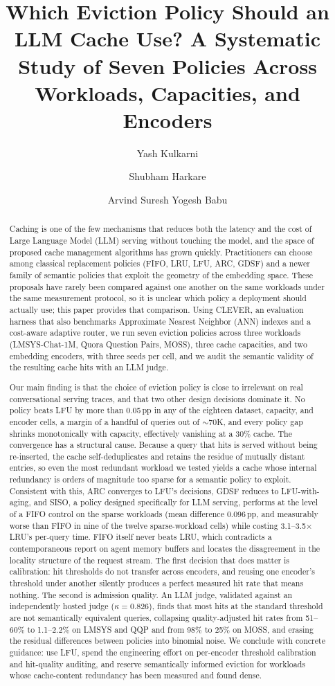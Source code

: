 \documentclass[sigconf,nonacm]{acmart}
\title{Which Eviction Policy Should an LLM Cache Use?
A Systematic Study of Seven Policies Across Workloads,
Capacities, and Encoders}
\author{Yash Kulkarni}
\affiliation{
  \institution{University of Michigan}
  \city{Ann Arbor}
  \state{Michigan}
  \country{USA}
}
\author{Shubham Harkare}
\affiliation{
  \institution{University of Michigan}
  \city{Ann Arbor}
  \state{Michigan}
  \country{USA}
}
\author{Arvind Suresh Yogesh Babu}
\affiliation{
  \institution{University of Michigan}
  \city{Ann Arbor}
  \state{Michigan}
  \country{USA}
}
\begin{document}
\begin{abstract}
Caching is one of the few mechanisms that reduces both the latency and the cost of Large Language Model (LLM) serving without touching the model, and the space of proposed cache management algorithms has grown quickly. Practitioners can choose among classical replacement policies (FIFO, LRU, LFU, ARC, GDSF) and a newer family of semantic policies that exploit the geometry of the embedding space. These proposals have rarely been compared against one another on the same workloads under the same measurement protocol, so it is unclear which policy a deployment should actually use; this paper provides that comparison. Using CLEVER, an evaluation harness that also benchmarks Approximate Nearest Neighbor (ANN) indexes and a cost-aware adaptive router, we run seven eviction policies across three workloads (LMSYS-Chat-1M, Quora Question Pairs, MOSS), three cache capacities, and two embedding encoders, with three seeds per cell, and we audit the semantic validity of the resulting cache hits with an LLM judge.

Our main finding is that the choice of eviction policy is close to irrelevant on real conversational serving traces, and that two other design decisions dominate it. No policy beats LFU by more than 0.05\,pp in any of the eighteen dataset, capacity, and encoder cells, a margin of a handful of queries out of ${\sim}70$K, and every policy gap shrinks monotonically with capacity, effectively vanishing at a 30\% cache. The convergence has a structural cause. Because a query that hits is served without being re-inserted, the cache self-deduplicates and retains the residue of mutually distant entries, so even the most redundant workload we tested yields a cache whose internal redundancy is orders of magnitude too sparse for a semantic policy to exploit. Consistent with this, ARC converges to LFU's decisions, GDSF reduces to LFU-with-aging, and SISO, a policy designed specifically for LLM serving, performs at the level of a FIFO control on the sparse workloads (mean difference 0.096\,pp, and measurably worse than FIFO in nine of the twelve sparse-workload cells) while costing 3.1--3.5$\times$ LRU's per-query time. FIFO itself never beats LRU, which contradicts a contemporaneous report on agent memory buffers and locates the disagreement in the locality structure of the request stream. The first decision that does matter is calibration: hit thresholds do not transfer across encoders, and reusing one encoder's threshold under another silently produces a perfect measured hit rate that means nothing. The second is admission quality. An LLM judge, validated against an independently hosted judge ($\kappa = 0.826$), finds that most hits at the standard threshold are not semantically equivalent queries, collapsing quality-adjusted hit rates from 51--60\% to 1.1--2.2\% on LMSYS and QQP and from 98\% to 25\% on MOSS, and erasing the residual differences between policies into binomial noise. We conclude with concrete guidance: use LFU, spend the engineering effort on per-encoder threshold calibration and hit-quality auditing, and reserve semantically informed eviction for workloads whose cache-content redundancy has been measured and found dense.
\end{abstract}
\end{document}
